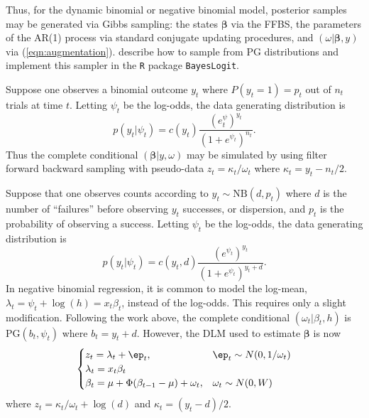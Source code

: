 \documentclass[11pt]{article}
\newcommand{\PG}{\text{PG}}
\newcommand{\NB}{\text{NB}}
\newcommand{\bbeta}{\boldsymbol{\beta}}
\begin{document}
Thus, for the dynamic binomial or negative binomial model, posterior samples may
be generated via Gibbs sampling: the states $\bbeta$ via the FFBS, the parameters
of the AR(1) process via standard conjugate updating procedures, and $(\omega |
\bbeta, y)$ via (\ref{eqn:augmentation}).  \cite{polson-etal-2012} describe how
to sample from $\PG$ distributions and implement this sampler in the \texttt{R}
package \texttt{BayesLogit}.

\begin{example}
Suppose one observes a binomial outcome $y_t$ where $P(y_t = 1) = p_t$ out of
$n_t$ trials at time $t$.  Letting $\psi_t$ be the log-odds, the data generating
distribution is
\[
p(y_t | \psi_t) = c(y_t) \frac{(e^\psi_t)^{y_t}}{(1+e^{\psi_t})^{n_t}}.
\]
Thus the complete conditional $(\bbeta | y, \omega)$ may be simulated by using
filter forward backward sampling with pseudo-data $z_t = \kappa_t / \omega_t$
where $\kappa_t = y_t - n_t / 2$.
\end{example}


\begin{example}
  Suppose that one observes counts according to $y_t \sim \NB(d, p_t)$ where $d$
  is the number of ``failures'' before observing $y_t$ successes, or dispersion,
  and $p_t$ is the probability of observing a success.  Letting $\psi_t$ be the
  log-odds, the data generating distribution is
\[
p(y_t | \psi_t) = c(y_t, d) \frac{(e^{\psi_t})^{y_t}}{(1+e^{\psi_t})^{y_t+d}}.
\]
In negative binomial regression, it is common to model the log-mean, $\lambda_t
= \psi_t + \log(h) = x_t \beta_t$, instead of the log-odds.  This requires only
a slight modification.  Following the work above, the complete conditional
$(\omega_t | \beta_t, h)$ is $\PG(b_t, \psi_t)$ where $b_t = y_t + d$.  However,
the DLM used to estimate $\bbeta$ is now
\[
\begin{cases}
z_t = \lambda_t + \ep_t, & \ep_t \sim N(0, 1/\omega_t) \\
\lambda_t = x_t \beta_t \\
\beta_t = \mu + \Phi (\beta_{t-1} - \mu) + \omega_t, & \omega_t \sim N(0, W)
\end{cases}
\]
where $z_t = \kappa_t / \omega_t + \log(d)$ and $\kappa_t = (y_t - d) / 2$.
\end{example}
\end{document}
